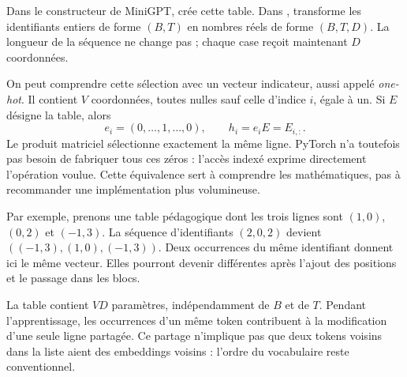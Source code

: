 

Dans le constructeur de MiniGPT,  crée cette table. Dans ,  transforme les identifiants entiers de forme $(B,T)$ en nombres réels de forme $(B,T,D)$. La longueur de la séquence ne change pas ; chaque case reçoit maintenant $D$ coordonnées.

On peut comprendre cette sélection avec un vecteur indicateur, aussi appelé \emph{one-hot}. Il contient $V$ coordonnées, toutes nulles sauf celle d'indice $i$, égale à un. Si $E$ désigne la table, alors
\[
 e_i=(0,\ldots,1,\ldots,0),\qquad h_i=e_iE=E_{i,:}.
\]
Le produit matriciel sélectionne exactement la même ligne. PyTorch n'a toutefois pas besoin de fabriquer tous ces zéros : l'accès indexé exprime directement l'opération voulue. Cette équivalence sert à comprendre les mathématiques, pas à recommander une implémentation plus volumineuse.

Par exemple, prenons une table pédagogique dont les trois lignes sont $(1,0)$, $(0,2)$ et $(-1,3)$. La séquence d'identifiants $(2,0,2)$ devient $((-1,3),(1,0),(-1,3))$. Deux occurrences du même identifiant donnent ici le même vecteur. Elles pourront devenir différentes après l'ajout des positions et le passage dans les blocs.

La table contient $VD$ paramètres, indépendamment de $B$ et de $T$. Pendant l'apprentissage, les occurrences d'un même token contribuent à la modification d'une seule ligne partagée. Ce partage n'implique pas que deux tokens voisins dans la liste aient des embeddings voisins : l'ordre du vocabulaire reste conventionnel.



